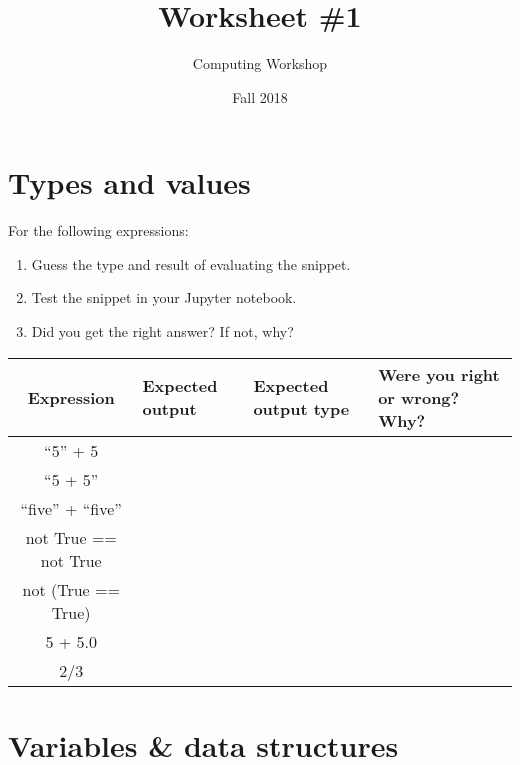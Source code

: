 \documentclass[11pt]{article}
\author{Computing Workshop}
\title{Worksheet \#1}
\date{Fall 2018}
\begin{document}
\maketitle

\section*{Types and values}

For the following expressions:
\begin{enumerate}
  \item
    Guess the type and result of evaluating the snippet.
  \item
    Test the snippet in your Jupyter notebook.
  \item
    Did you get the right answer? If not, why?
\end{enumerate}

\begin{center}
\renewcommand{\arraystretch}{3.5}
\begin{tabular}{| c | p{5em}| p{5em} | p{21em} |}
    \hline %
    \textbf{Expression} & \textbf{Expected output}
    & \textbf{Expected output type} & \textbf{Were you right or wrong? Why?} \\ \hline
    ``5'' + 5 & ~ & ~ & ~ \\ \hline
    ``5 + 5'' & ~ & ~ & ~ \\ \hline
    ``five'' + ``five'' & ~ & ~ & ~ \\ \hline
    not True == not True & ~ & ~ & ~ \\ \hline
    not (True == True) & ~ & ~ & ~ \\ \hline
    5 + 5.0 & ~ & ~ & ~ \\ \hline
    2/3 & ~ & ~ & ~ \\ \hline
\end{tabular}
\end{center}

\newpage

\section*{Variables \& data structures}
\end{document}
